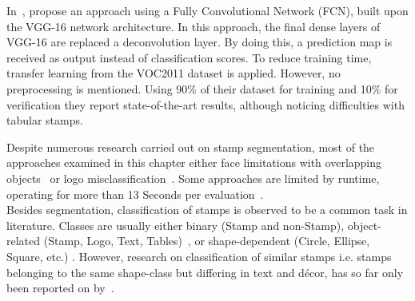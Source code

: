 \begin{description}
\begin{enumerate*}[label={\alph*)},font={\color{red!50!black}\bfseries}]
        In~\cite{Younas.09.11.201715.11.2017},
        \citeauthor*{Younas.09.11.201715.11.2017} propose an approach using a
        Fully Convolutional Network (FCN), built upon the VGG-16 network
        architecture. In this approach, the final dense layers of VGG-16 are
        replaced a deconvolution layer. By doing this, a prediction map is
        received as output instead of classification scores. To reduce training
        time, transfer learning from the VOC2011 dataset is applied. However,
        no preprocessing is mentioned. Using 90\% of their dataset for training
        and 10\% for verification they report state-of-the-art results,
        although noticing difficulties with tabular stamps.
    \end{enumerate*}
\end{description}

Despite numerous research carried out on stamp segmentation, most of the 
approaches examined in this chapter either face limitations with overlapping 
objects~\cite{Nandedkar.23.08.201526.08.2015, Nandedkar.16.12.201519.12.2015, 
Forczmanski.2016, Ahmed.25.08.201328.08.2013, Dey.16.12.201519.12.2015, 
Forczmanski.2015, Forczmanski.2016} or logo misclassification~\cite
{Ahmed.25.08.201328.08.2013, Dey.16.12.201519.12.2015, 
Micenkova.18.09.201121.09.2011}. Some approaches are limited by runtime, 
operating for more than 13 Seconds per evaluation~\cite{Ahmed.2016, 
Nandedkar.23.08.201526.08.2015}.\\
Besides segmentation, classification of stamps is observed to be a common task 
in literature. Classes are usually either binary (Stamp and non-Stamp), 
object-related (Stamp, Logo, Text, Tables)~\cite{Forczmanski.2016,
Nandedkar.23.08.201526.08.2015, Nandedkar.16.12.201519.12.2015, 
Dey.16.12.201519.12.2015}, or shape-dependent (Circle, Ellipse, Square, etc.)
\cite{Forczmanski.2015}. However, research on classification of similar stamps 
i.e. stamps belonging to the same shape-class but differing in text and décor, 
has so far only been reported on by~\cite{Petej.07.07.201310.07.2013}.